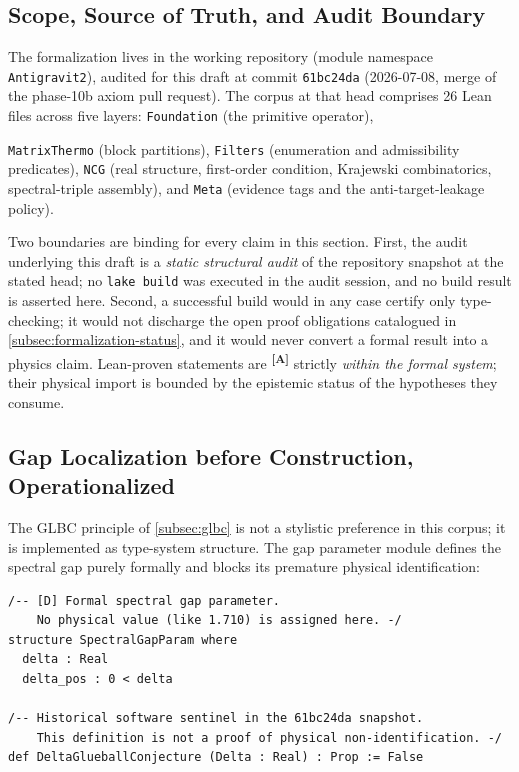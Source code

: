 \documentclass[12pt,a4paper,twoside]{article}
\theoremstyle{plain}
\theoremstyle{definition}
\theoremstyle{remark}
\newcommand{\catmark}[1]{\textsuperscript{\textsf{\textbf{[#1]}}}}
\begin{document}
\subsection{Scope, Source of Truth, and Audit Boundary}
\label{subsec:lean-scope}

{\sloppy The formalization lives in the working repository
 (module namespace
\texttt{Antigravit2}), audited for this draft at commit
\texttt{61bc24da} (2026-07-08, merge of the phase-10b axiom pull
request). The corpus at that head comprises 26 Lean files across five
layers: \texttt{Foundation} (the primitive operator),\par}
\texttt{MatrixThermo} (block partitions), \texttt{Filters} (enumeration
and admissibility predicates), \texttt{NCG} (real structure, first-order
condition, Krajewski combinatorics, spectral-triple assembly), and
\texttt{Meta} (evidence tags and the anti-target-leakage policy).

Two boundaries are binding for every claim in this section. First, the
audit underlying this draft is a \emph{static structural audit} of the
repository snapshot at the stated head; no \texttt{lake build} was
executed in the audit session, and no build result is asserted here.
Second, a successful build would in any case certify only type-checking;
it would not discharge the open proof obligations catalogued in
\cref{subsec:formalization-status}, and it would never convert a formal
result into a physics claim. Lean-proven statements are \catmark{A}
strictly \emph{within the formal system}; their physical import is bounded
by the epistemic status of the hypotheses they consume.

\subsection{Gap Localization before Construction, Operationalized}
\label{subsec:glbc-operational}

The GLBC principle of \cref{subsec:glbc} is not a stylistic preference in
this corpus; it is implemented as type-system structure. The gap parameter
module defines the spectral gap purely formally and blocks its premature
physical identification:

\begin{lstlisting}
/-- [D] Formal spectral gap parameter.
    No physical value (like 1.710) is assigned here. -/
structure SpectralGapParam where
  delta : Real
  delta_pos : 0 < delta

/-- Historical software sentinel in the 61bc24da snapshot.
    This definition is not a proof of physical non-identification. -/
def DeltaGlueballConjecture (Delta : Real) : Prop := False
\end{lstlisting}
\end{document}
